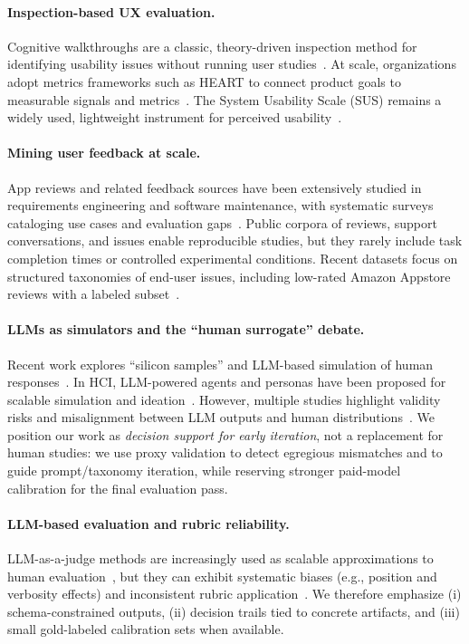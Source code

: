 \paragraph{Inspection-based UX evaluation.}
Cognitive walkthroughs are a classic, theory-driven inspection method for identifying usability issues without running user studies~\cite{polson1992cognitive}.
At scale, organizations adopt metrics frameworks such as HEART to connect product goals to measurable signals and metrics~\cite{rodden2010heart}.
The System Usability Scale (SUS) remains a widely used, lightweight instrument for perceived usability~\cite{brooke1996sus}.

\paragraph{Mining user feedback at scale.}
App reviews and related feedback sources have been extensively studied in requirements engineering and software maintenance,
with systematic surveys cataloging use cases and evaluation gaps~\cite{dabrowski2022review}.
Public corpora of reviews, support conversations, and issues enable reproducible studies, but they rarely include
task completion times or controlled experimental conditions.
Recent datasets focus on structured taxonomies of end-user issues, including low-rated Amazon Appstore reviews with a labeled subset~\cite{amazonlowrated2026dataset}.

\paragraph{LLMs as simulators and the ``human surrogate'' debate.}
Recent work explores ``silicon samples'' and LLM-based simulation of human responses~\cite{argyle2023outofone,aher2023simulate,horton2023homosilicus}.
In HCI, LLM-powered agents and personas have been proposed for scalable simulation and ideation~\cite{park2023generativeagents,choi2025proxona,schuller2024personas,prpa2024syntheticpersonae}.
However, multiple studies highlight validity risks and misalignment between LLM outputs and human distributions~\cite{bisbee2024perils,amirova2024algorithmicfidelity,gao2024scylla,li2025personacatch}.
We position our work as \emph{decision support for early iteration}, not a replacement for human studies:
we use proxy validation to detect egregious mismatches and to guide prompt/taxonomy iteration,
while reserving stronger paid-model calibration for the final evaluation pass.

\paragraph{LLM-based evaluation and rubric reliability.}
LLM-as-a-judge methods are increasingly used as scalable approximations to human evaluation~\cite{liu2023geval,zheng2023mtbench},
but they can exhibit systematic biases (e.g., position and verbosity effects) and inconsistent rubric application~\cite{wang2024notfair,shi2024positionbias,stureborg2024inconsistent}.
We therefore emphasize (i) schema-constrained outputs, (ii) decision trails tied to concrete artifacts, and (iii) small gold-labeled calibration sets when available.

